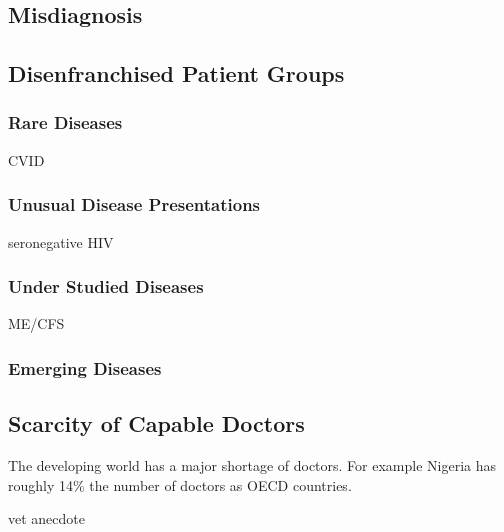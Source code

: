 \documentclass{article}
\begin{document}
\subsection{Misdiagnosis}
\cite{singh2014frequency}

\subsection{Disenfranchised Patient Groups}

\subsubsection{Rare Diseases}

CVID

\subsubsection{Unusual Disease Presentations}

seronegative HIV

\subsubsection{Under Studied Diseases}

ME/CFS

\subsubsection{Emerging Diseases}

\subsection{Scarcity of Capable Doctors}


The developing world has a major shortage of doctors. For example Nigeria has roughly 14\% the number of doctors as OECD countries. \cite{wef2014}


vet anecdote

\end{document}
